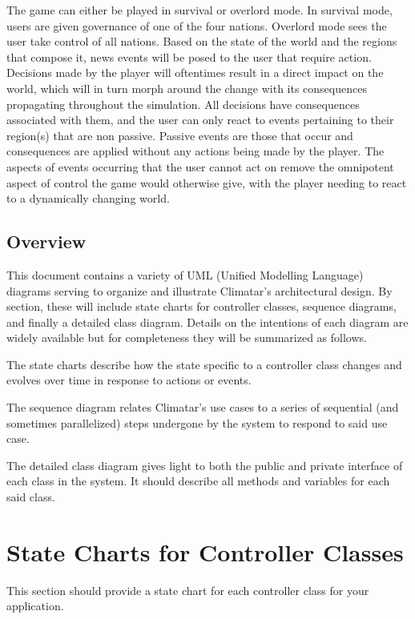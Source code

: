 \documentclass[]{article}
\begin{document}
\vspace{5mm}
\noindent
The game can either be played in survival or overlord mode. In
survival mode, users are given governance of one of the four nations.
Overlord mode sees the user take control of all nations. Based
on the state of the world and the regions that compose it, news events
will be posed to the user that require action. Decisions made by the
player will oftentimes result in a direct impact on the world, which
will in turn morph around the change with its consequences propagating
throughout the simulation. All decisions have consequences associated
with them, and the user can only react to events pertaining to their
region(s) that are non passive. Passive events are those that occur
and consequences are applied without any actions being made by the
player. The aspects of events occurring that the user cannot act on
remove the omnipotent aspect of control the game would otherwise give,
with the player needing to react to a dynamically changing world.

\subsection{Overview}
\label{sub:overview}
This document contains a variety of UML (Unified Modelling Language)
diagrams serving to organize and illustrate Climatar's architectural
design. By section, these will include state charts for controller
classes, sequence diagrams, and finally a detailed class
diagram. Details on the intentions of each diagram are widely
available but for completeness they will be summarized as follows.

\vspace{5mm}
\noindent
The state charts describe how the state specific to a controller class
changes and evolves over time in response to actions or events.

\vspace{5mm}
\noindent
The sequence diagram relates Climatar's use cases to a series of sequential
(and sometimes parallelized) steps undergone by the system to respond to 
said use case.

\vspace{5mm}
\noindent
The detailed class diagram gives light to both the public and private
interface of each class in the system. It should describe all methods
and variables for each said class.


\section{State Charts for Controller Classes}
\label{sec:state_charts_for_controller_classes}
This section should provide a state chart for each controller class for your application.
\end{document}
